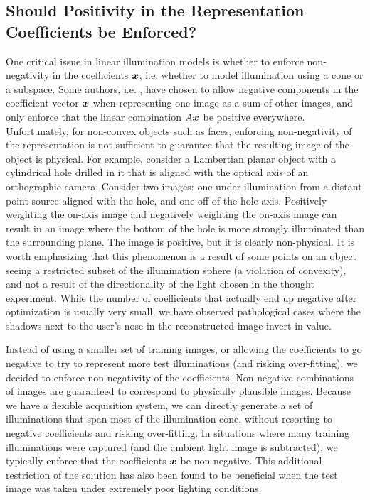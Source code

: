 \subsection{Should Positivity in the Representation Coefficients
be Enforced?} 
\label{sec:positivity}
One critical issue in linear illumination models
is whether to enforce non-negativity in the coefficients ${\boldsymbol{x}}$,
i.e. whether to model illumination using a cone or a subspace.
Some authors, i.e. \cite{Basri2003-PAMI}, have chosen to allow
negative components in the coefficient vector ${\boldsymbol{x}}$ when
representing one image as a sum of other images, and only
enforce that the linear combination $A{\boldsymbol{x}}$ be positive
everywhere.  Unfortunately, for non-convex objects such as
faces, enforcing non-negativity of the representation is not
sufficient to guarantee that the resulting image of the object
is physical.  For example, consider a Lambertian planar object
with a cylindrical hole drilled in it that is aligned with the
optical axis of an orthographic camera.  Consider two images:
one under illumination from a distant point source aligned with
the hole, and one off of the hole axis.  Positively weighting
the on-axis image and negatively weighting the on-axis image
can result in an image where the bottom of the hole is more
strongly illuminated than the surrounding plane.  The image is
positive, but it is clearly non-physical.  It is worth
emphasizing that this phenomenon is a result of some points on
an object seeing a restricted subset of the illumination sphere
(a violation of convexity),  and not a result of the
directionality of the light chosen in the thought experiment.
While the number of coefficients that actually end up negative
after optimization is usually very small, we have observed
pathological cases where the shadows next to the user's nose in
the reconstructed image invert in value.

Instead of using a smaller set of training images, or allowing the coefficients
to go negative to try to represent more test illuminations (and risking
over-fitting), we decided to enforce non-negativity of the coefficients.
Non-negative combinations of images are guaranteed to correspond to physically
plausible images.  Because we have a flexible acquisition system, we can
directly generate a set of illuminations that span most of the illumination
cone, without resorting to negative coefficients and risking over-fitting.  In
situations where many training illuminations were captured (and the ambient
light image is subtracted), we typically enforce that the coefficients ${\boldsymbol{x}}$ be
non-negative.  This additional restriction of the solution has also been found
to be beneficial when the test image was taken under extremely poor lighting
conditions.


